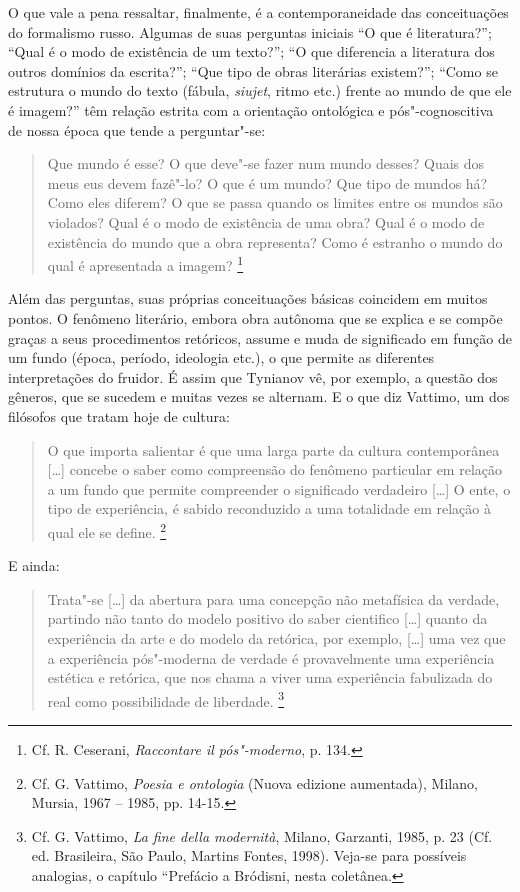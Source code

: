 O que vale a pena ressaltar, finalmente, é a contemporaneidade das
conceituações do formalismo russo. Algumas de suas perguntas iniciais
``O que é literatura?''; ``Qual é o modo de existência de um texto?'';
``O que diferencia a literatura dos outros domínios da escrita?''; ``Que
tipo de obras literárias existem?''; ``Como se estrutura o mundo do
texto (fábula, \emph{siujet}, ritmo etc.) frente ao mundo de que ele é
imagem?'' têm relação estrita com a orientação ontológica e
pós"-cognoscitiva de nossa época que tende a perguntar"-se:

\begin{quote}
Que mundo é esse? O que deve"-se fazer num mundo desses? Quais dos meus
eus devem fazê"-lo? O que é um mundo? Que tipo de mundos há? Como eles
diferem? O que se passa quando os limites entre os mundos são violados?
Qual é o modo de existência de uma obra? Qual é o modo de existência do
mundo que a obra representa? Como é estranho o mundo do qual é
apresentada a imagem? \footnote{Cf. R. Ceserani, \emph{Raccontare il
  pós"-moderno}, p. 134.}
\end{quote}

Além das perguntas, suas próprias conceituações básicas coincidem em
muitos pontos. O fenômeno literário, embora obra autônoma que se explica
e se compõe graças a seus procedimentos retóricos, assume e muda de
significado em função de um fundo (época, período, ideologia etc.), o
que permite as diferentes interpretações do fruidor. É assim que
Tynianov vê, por exemplo, a questão dos gêneros, que se sucedem e muitas
vezes se alternam. E o que diz Vattimo, um dos filósofos que tratam hoje
de cultura:

\begin{quote}
O que importa salientar é que uma larga parte da cultura contemporânea
{[}\ldots{}{]} concebe o saber como compreensão do fenômeno particular em
relação a um fundo que permite compreender o significado verdadeiro
{[}\ldots{}{]} O ente, o tipo de experiência, é sabido reconduzido a uma
totalidade em relação à qual ele se define. \footnote{Cf. G. Vattimo,
  \emph{Poesia e ontologia} (Nuova edizione aumentada), Milano, Mursia,
  1967 -- 1985, pp. 14-15.}
\end{quote}

E ainda:

\begin{quote}
Trata"-se {[}\ldots{}{]} da abertura para uma concepção não metafísica da
verdade, partindo não tanto do modelo positivo do saber cientifico
{[}\ldots{}{]} quanto da experiência da arte e do modelo da retórica, por
exemplo, {[}\ldots{}{]} uma vez que a experiência pós"-moderna de verdade é
provavelmente uma experiência estética e retórica, que nos chama a viver
uma experiência fabulizada do real como possibilidade de liberdade.
\footnote{Cf. G. Vattimo, \emph{La fine della modernità}, Milano,
  Garzanti, 1985, p. 23 (Cf. ed. Brasileira, São Paulo, Martins Fontes,
  1998). Veja-se para possíveis analogias, o capítulo ``Prefácio a
  Bródisni, nesta coletânea.}
\end{quote}

